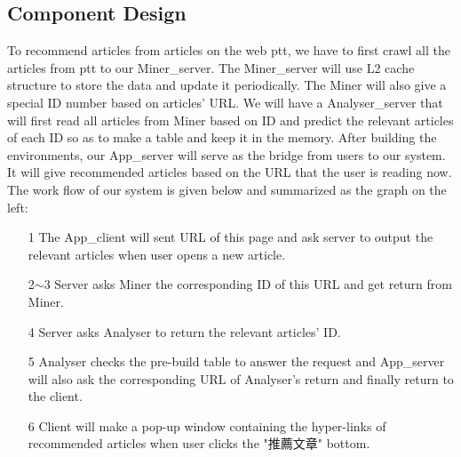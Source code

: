 \documentclass[a4paper, 10pt,twocolumn]{article} %
\begin{document}
\subsection{\label{sec:level2}Component Design}
To recommend articles from articles on the web ptt, we have to first crawl all the articles from ptt to our Miner\_server. The Miner\_server will use L2 cache structure to store the data and update it periodically. The Miner will also give a special ID number based on articles' URL. We will have a Analyser\_server that will first read all articles from Miner based on ID and predict the relevant articles of each ID so as to make a table and keep it in the memory. After building the environments, our App\_server will serve as the bridge from users to our system. It will give recommended articles based on the URL that the user is reading now. The work flow of our system is given below and summarized as the graph on the left: 
\begin{enumerate}
\item[1] The App\_client will sent URL of this page and ask server to output the relevant articles when user opens a new article.
\item[2$\sim$3] Server asks Miner the corresponding ID of this URL and get return from Miner.
\item[4] Server asks Analyser to return the relevant articles' ID.   
\item[5] Analyser checks the pre-build table to answer the request and App\_server will also ask the corresponding URL of Analyser's return and finally return to the client.
\item[6] Client will make a pop-up window containing the hyper-links of recommended articles when user clicks the "推薦文章" bottom.
\end{enumerate}
\end{document}
